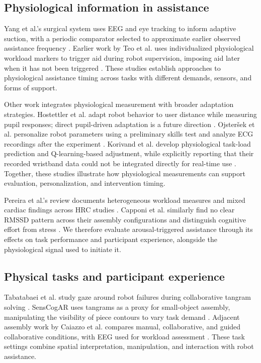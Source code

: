 \documentclass[sigconf]{aamas}
\begin{document}
\subsection{Physiological information in assistance}

Yang et al.'s surgical system uses EEG and eye tracking to inform adaptive suction, with a periodic comparator selected to approximate earlier observed assistance frequency \cite{yang2024}. Earlier work by Teo et al. uses individualized physiological workload markers to trigger aid during robot supervision, imposing aid later when it has not been triggered \cite{teo2018}. These studies establish approaches to physiological assistance timing across tasks with different demands, sensors, and forms of support.

Other work integrates physiological measurement with broader adaptation strategies. Hostettler et al. adapt robot behavior to user distance while measuring pupil responses; direct pupil-driven adaptation is a future direction \cite{hostettler2025}. Ojsteršek et al. personalize robot parameters using a preliminary skills test and analyze ECG recordings after the experiment \cite{ojstersek2024}. Korivand et al. develop physiological task-load prediction and Q-learning-based adjustment, while explicitly reporting that their recorded wristband data could not be integrated directly for real-time use \cite{korivand2024}. Together, these studies illustrate how physiological measurements can support evaluation, personalization, and intervention timing.

Pereira et al.'s review documents heterogeneous workload measures and mixed cardiac findings across HRC studies \cite{pereira2025}. Capponi et al. similarly find no clear RMSSD pattern across their assembly configurations and distinguish cognitive effort from stress \cite{capponi2024}. We therefore evaluate arousal-triggered assistance through its effects on task performance and participant experience, alongside the physiological signal used to initiate it.

\subsection{Physical tasks and participant experience}

Tabatabaei et al. study gaze around robot failures during collaborative tangram solving \cite{tabatabaei2025}. SensCogAR uses tangrams as a proxy for small-object assembly, manipulating the visibility of piece contours to vary task demand \cite{melo2026}. Adjacent assembly work by Caiazzo et al. compares manual, collaborative, and guided collaborative conditions, with EEG used for workload assessment \cite{caiazzo2024}. These task settings combine spatial interpretation, manipulation, and interaction with robot assistance.
\end{document}
